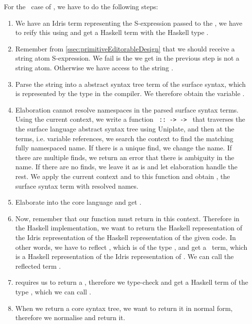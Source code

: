 For the \TT\ case of , we have to do the following steps:
\begin{enumerate}
  \item We have an Idris term  representing the S-expression passed to
    the , we have to reify this using  and
    get a Haskell term with the Haskell type .
  \item Remember from \autoref{ssec:primitiveEditorableDesign} that we should
    receive a string atom S-expression. We fail is the  we get in the
    previous step is not a string atom. Otherwise we have access to the string
    .
  \item Parse the string  into a abstract syntax tree term  of
    the surface syntax, which is represented by the type  in the
    compiler. We therefore obtain the variable .
  \item Elaboration cannot resolve namespaces in the parsed surface syntax
    terms.  Using the current context, we write a function
    \texttt{ ::  ->  ->   }
    that traverses the the surface language abstract syntax tree using
    Uniplate\cite{uniplate}, and then at the  terms, i.e. variable
    references, we search the context to find the matching fully namespaced
    name. If there is a unique find, we change the name. If there are multiple
    finds, we return an error that there is ambiguity in the name. If there are
    no finds, we leave it as is and let elaboration handle the rest.
    We apply the current context and  to this function and obtain
    , the surface syntax term with resolved names.
  \item Elaborate  into the core language and get .
  \item Now, remember that our function  must return
     in this context. Therefore in the Haskell implementation, we
    want to return the Haskell representation of the Idris representation of
    the Haskell representation of the given code. In other words, we have to
    reflect , which is of the type , and get a \Raw\ term, which
    is a Haskell representation of the Idris representation of .
    We can call the reflected term .
  \item {} requires us to return a , therefore we
    type-check  and get a Haskell term of the type ,
    which we can call .
  \item When we return a core syntax tree, we want to return it in normal form,
    therefore we normalise  and return it.
\end{enumerate}

